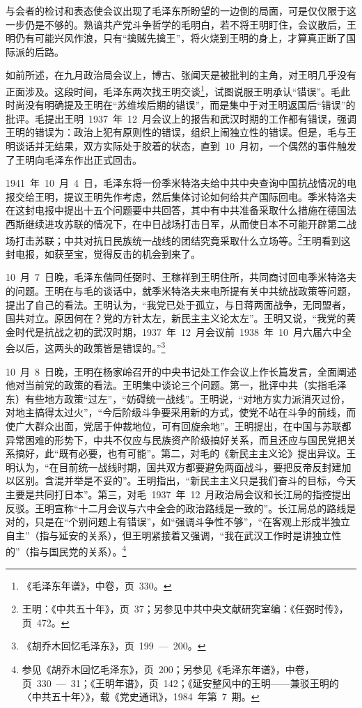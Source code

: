 与会者的检讨和表态使会议出现了毛泽东所盼望的一边倒的局面，可是仅仅限于这一步仍是不够的。熟谙共产党斗争哲学的毛明白，若不将王明盯住，会议散后，王明仍有可能兴风作浪，只有“擒贼先擒王”，将火烧到王明的身上，才算真正断了国际派的后路。

如前所述，在九月政治局会议上，博古、张闻天是被批判的主角，对王明几乎没有正面涉及。这段时间，毛泽东两次找王明交谈\footnote{《毛泽东年谱》，中卷，页~330。}，试图说服王明承认“错误”。毛此时尚没有明确提及王明在“苏维埃后期的错误”，而是集中于对王明返国后“错误”的批评。毛提出王明~1937~年~12~月会议上的报告和武汉时期的工作都有错误，强调王明的错误为：政治上犯有原则性的错误，组织上闹独立性的错误。但是，毛与王明谈话并无结果，双方实际处于胶着的状态，直到~10~月初，一个偶然的事件触发了王明向毛泽东作出正式回击。

1941~年~10~月~4~日，毛泽东将一份季米特洛夫给中共中央查询中国抗战情况的电报交给王明，提议王明先作考虑，然后集体讨论如何给共产国际回电。季米特洛夫在这封电报中提出十五个问题要中共回答，其中有中共准备采取什么措施在德国法西斯继续进攻苏联的情况下，在中日战场打击日军，从而使日本不可能开辟第二战场打击苏联；中共对抗日民族统一战线的团结究竟采取什么立场等。\footnote{王明：《中共五十年》，页~37；另参见中共中央文献研究室编：《任弼时传》，页~472。}王明看到这封电报，如获至宝，觉得反击的机会到来了。

10~月~7~日晚，毛泽东偕同任弼时、王稼祥到王明住所，共同商讨回电季米特洛夫的问题。王明在与毛的谈话中，就季米特洛夫来电所提有关中共统战政策等问题，提出了自己的看法。王明认为，“我党已处于孤立，与日蒋两面战争，无同盟者，国共对立。原因何在？党的方针太左，新民主主义论太左”。王明又说，“我党的黄金时代是抗战之初的武汉时期，1937~年~12~月会议前~1938~年~10~月六届六中全会以后，这两头的政策皆是错误的。”\footnote{《胡乔木回忆毛泽东》，页~199~—~200。}

10~月~8~日晚，王明在杨家岭召开的中央书记处工作会议上作长篇发言，全面阐述他对当前党的政策的看法。王明集中谈论三个问题。第一，批评中共（实指毛泽东）有些地方政策“过左”，“妨碍统一战线”。王明说，“对地方实力派消灭过份，对地主搞得太过火”，“今后阶级斗争要采用新的方式，使党不站在斗争的前线，而使广大群众出面，党居于仲裁地位，可有回旋余地”。王明提出，在中国与苏联都异常困难的形势下，中共不仅应与民族资产阶级搞好关系，而且还应与国民党把关系搞好，此“既有必要，也有可能”。第二，对毛的《新民主主义论》提出异议。王明认为，“在目前统一战线时期，国共双方都要避免两面战斗，要把反帝反封建加以区别。含混并举是不妥的”。王明指出，“新民主主义只是我们奋斗的目标，今天主要是共同打日本”。第三，对毛~1937~年~12~月政治局会议和长江局的指控提出反驳。王明宣称“十二月会议与六中全会的政治路线是一致的”。长江局总的路线是对的，只是在“个别问题上有错误”，如“强调斗争性不够”，“在客观上形成半独立自主”（指与延安的关系），但王明紧接着又强调，“我在武汉工作时是讲独立性的”（指与国民党的关系）。\footnote{参见《胡乔木回忆毛泽东》，页~200；另参见《毛泽东年谱》，中卷，页~330~—~31；《王明年谱》，页~142；《延安整风中的王明——兼驳王明的〈中共五十年〉》，载《党史通讯》，1984~年第~7~期。}

